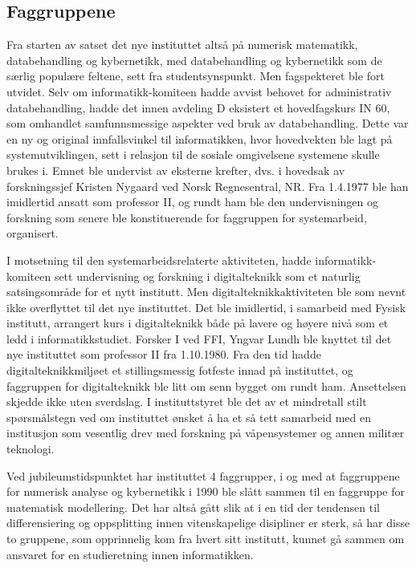 \documentclass[../main.tex]{subfiles}
\begin{document}
\subsection{Faggruppene}
Fra starten av satset det nye instituttet altså på numerisk matematikk, databehandling og kybernetikk, med databehandling og kybernetikk som de særlig populære feltene, sett fra studentsynspunkt. Men fagspekteret ble fort utvidet. Selv om informatikk-komiteen hadde avvist behovet for administrativ databehandling, hadde det innen avdeling D eksistert et hovedfagskurs IN 60, som omhandlet samfunnsmessige aspekter ved bruk av databehandling. Dette var en ny og original innfallsvinkel til informatikken, hvor hovedvekten ble lagt på systemutviklingen, sett i relasjon til de sosiale omgivelsene systemene skulle brukes i. Emnet ble undervist av eksterne krefter, dvs. i hovedsak av forskningssjef Kristen Nygaard ved Norsk Regnesentral, NR. Fra 1.4.1977 ble han imidlertid ansatt som professor II, og rundt ham ble den undervisningen og forskning som senere ble konstituerende for faggruppen for systemarbeid, organisert.

I motsetning til den systemarbeidsrelaterte aktiviteten, hadde informatikk-komiteen sett undervisning og forskning i digitalteknikk som et naturlig satsingsområde for et nytt institutt. Men digitalteknikkaktiviteten ble som nevnt ikke overflyttet til det nye instituttet. Det ble imidlertid, i samarbeid med Fysisk institutt, arrangert kurs i digitalteknikk både på lavere og høyere nivå som et ledd i informatikkstudiet. Forsker I ved FFI, Yngvar Lundh ble knyttet til det nye instituttet som professor II fra 1.10.1980. Fra den tid hadde digitalteknikkmiljøet et stillingsmessig fotfeste innad på instituttet, og faggruppen for digitalteknikk ble litt om senn bygget om rundt ham. Ansettelsen skjedde ikke uten sverdslag. I instituttstyret ble det av et mindretall stilt spørsmålstegn ved om instituttet ønsket å ha et så tett samarbeid med en institusjon som vesentlig drev med forskning på våpensystemer og annen militær teknologi.

Ved jubileumstidspunktet har instituttet 4 faggrupper, i og med at faggruppene for numerisk analyse og kybernetikk i 1990 ble slått sammen til en faggruppe for matematisk modellering. Det har altså gått slik at i en tid der tendensen til differensiering og oppsplitting innen vitenskapelige disipliner er sterk, så har disse to gruppene, som opprinnelig kom fra hvert sitt institutt, kunnet gå sammen om ansvaret for en studieretning innen informatikken.
\end{document}
